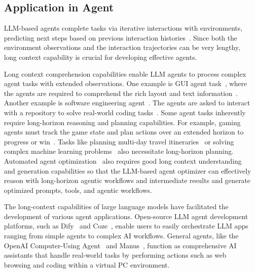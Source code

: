 \documentclass[11pt, a4paper, logo, copyright, nonumbering]{map}
\begin{document}
\subsection{Application in Agent}


LLM-based agents complete tasks via iterative interactions with environments, predicting next steps based on previous interaction histories~\citep{DBLP:conf/iclr/YaoZYDSN023,DBLP:journals/corr/abs-2309-07864,DBLP:journals/corr/abs-2309-07870}. Since both the environment observations and the interaction trajectories can be very lengthy, long context capability is crucial for developing effective agents.

Long context comprehension capabilities enable LLM agents to process complex agent tasks with extended observations. 
One example is GUI agent task~\citep{hu2024agents}, where the agents are required to comprehend the rich layout and text information~\citep{zhou2023webarena,DBLP:journals/corr/abs-2404-05955,xie2024osworld}. Another example is software engineering agent~\citep{jimenez2024swebench}. The agents are asked to interact with a repository to solve real-world coding tasks~\citep{DBLP:conf/nips/YangJWLYNP24,DBLP:conf/issta/0002RFR24,xia2024agentless,wang2024openhands_}.
Some agent tasks inherently require long-horizon reasoning and planning capabilities. 
For example, gaming agents must track the game state and plan actions over an extended horizon to progress or win~\citep{DBLP:journals/corr/abs-2403-03186}.
Tasks like planning multi-day travel itineraries~\citep{chen2024travelagent} or solving complex machine learning problems~\citep{DBLP:journals/corr/abs-2410-07095,DBLP:journals/corr/abs-2310-03302} also necessitate long-horizon planning. Automated agent optimization~\citep{DBLP:conf/icml/ZhugeWKFKS24,DBLP:journals/corr/abs-2406-18532} also requires good long context understanding and generation capabilities so that the LLM-based agent optimizer can effectively reason with long-horizon agentic workflows and intermediate results and generate optimized prompts, tools, and agentic workflows.

The long-context capabilities of large language models have facilitated the development of various agent applications. Open-source LLM agent development platforms, such as Dify~\citep{dify} and Coze~\citep{coze}, enable users to easily orchestrate LLM apps ranging from simple agents to complex AI workflows. General agents, like the OpenAI Computer-Using Agent~\citep{oai2025computeruse} and Manus~\citep{manus}, function as comprehensive AI assistants that handle real-world tasks by performing actions such as web browsing and coding within a virtual PC environment.
\end{document}
